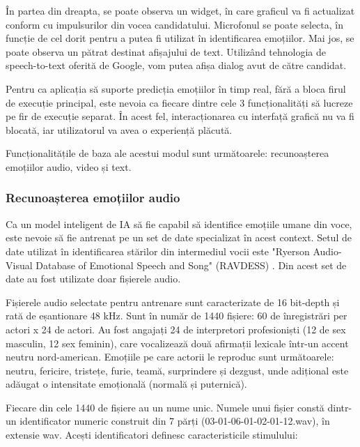 \documentclass[a4paper, 12pt]{report}
\begin{document}
	În partea din dreapta, se poate observa un widget, în care graficul va fi actualizat conform cu impulsurilor din vocea candidatului. Microfonul se poate selecta, în funcție de cel dorit pentru a putea fi utilizat în identificarea emoțiilor. Mai jos, se poate observa un pătrat destinat afișajului de text. Utilizând tehnologia de speech-to-text oferită de Google, vom putea afișa dialog avut de către candidat.
	
	Pentru ca aplicația să suporte predicția emoțiilor în timp real, fără a bloca firul de execuție principal, este nevoia ca fiecare dintre cele 3 funcționalități să lucreze pe fir de execuție separat. În acest fel, interacționarea cu interfață grafică nu va fi blocată, iar utilizatorul va avea o experiență plăcută.
	
	Funcționalitățile de baza ale acestui modul sunt următoarele: recunoașterea emoțiilor audio, video și text.	
	
	\subsubsection{Recunoașterea emoțiilor audio}
	Ca un model inteligent de IA să fie capabil să identifice emoțiile umane din voce, este nevoie să fie antrenat pe un set de date specializat în acest context. Setul de date utilizat în identificarea stărilor din intermediul vocii este "Ryerson Audio-Visual Database of Emotional Speech and Song" (RAVDESS) \cite{ravdess}. Din acest set de date au fost utilizate doar fișierele audio.

	Fișierele audio selectate pentru antrenare sunt caracterizate de 16 bit-depth și rată de eșantionare 48 kHz. Sunt în număr de 1440 fișiere: 60 de înregistrări per actori x 24 de actori. Au fost angajați 24 de interpretori profesioniști (12 de sex masculin, 12 sex feminin), care vocalizează două afirmații lexicale într-un accent neutru nord-american. Emoțiile pe care actorii le reproduc sunt următoarele: neutru, fericire, tristețe, furie, teamă, surprindere și dezgust, unde adițional este adăugat o intensitate emoțională (normală și puternică).

	Fiecare din cele 1440 de fișiere au un nume unic. Numele unui fișier constă dintr-un identificator numeric construit din 7 părți (03-01-06-01-02-01-12.wav), în extensie wav. Acești identificatori definesc caracteristicile stimulului:
	
\end{document}
